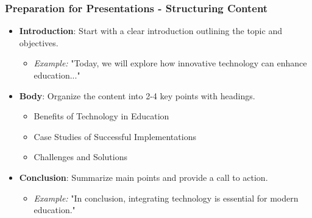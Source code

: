 \documentclass[aspectratio=169]{beamer}
\begin{document}
\begin{frame}[fragile]
    \frametitle{Preparation for Presentations - Structuring Content}
    \begin{itemize}
        \item \textbf{Introduction}: Start with a clear introduction outlining the topic and objectives.
        \begin{itemize}
            \item \textit{Example:} "Today, we will explore how innovative technology can enhance education..."
        \end{itemize}
        
        \item \textbf{Body}: Organize the content into 2-4 key points with headings.
        \begin{itemize}
            \item Benefits of Technology in Education
            \item Case Studies of Successful Implementations
            \item Challenges and Solutions
        \end{itemize}
        
        \item \textbf{Conclusion}: Summarize main points and provide a call to action.
        \begin{itemize}
            \item \textit{Example:} "In conclusion, integrating technology is essential for modern education."
        \end{itemize}
    \end{itemize}
\end{frame}
\end{document}
